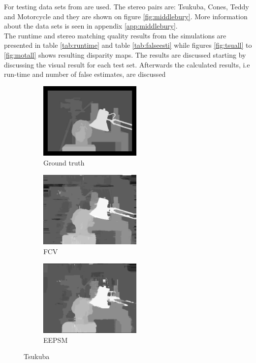 For testing data sets from \cite{middlebury2016} are used. The stereo pairs are: Tsukuba, Cones, Teddy and Motorcycle and they are shown on figure \vref{fig:middlebury}. More information about the data sets is seen in appendix \vref{app:middlebury}.\\

The runtime and stereo matching quality results from the simulations are presented in table \vref{tab:runtime} and table \vref{tab:falseesti} while figures \vref{fig:tsuall} to \vref{fig:motall} shows resulting disparity maps. The results are discussed starting by discussing the visual result for each test set. Afterwards the calculated results, i.e run-time and number of false estimates, are discussed\\

\begin{figure}[ht]
  \centering
  \begin{subfigure}[t]{0.3\textwidth}
    \centering\includegraphics[width=5cm]{figures/tsu_gt}
    \caption{Ground truth \label{fig:tsu_gt}}
  \end{subfigure}\hspace{0.5cm}
  \begin{subfigure}[t]{0.3\textwidth}
    \centering\includegraphics[width=5cm]{figures/tsu_fcv}
    \caption{FCV\label{fig:tsu_fcv}}
  \end{subfigure}\hspace{0.5cm}
  \begin{subfigure}[t]{0.3\textwidth}
    \centering\includegraphics[width=5cm]{figures/tsu_eepsm1}
    \caption{EEPSM\label{fig:tsu_eepsm}}
  \end{subfigure}
  \caption{Tsukuba \cite{Scharstein2002}\label{fig:tsuall}}
\end{figure}

